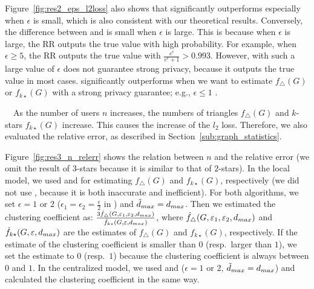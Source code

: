 Figure~\ref{fig:res2_eps_l2loss} also shows that 
 significantly outperforms  especially when $\epsilon$ is small, which is also consistent with our theoretical results. 
Conversely, the difference between  and  is small when $\epsilon$ is large. 
This is because when $\epsilon$ is large, the RR outputs the true value with high probability. 
For example, when 
$\epsilon \geq 5$, 
the RR outputs the true value with 
$\frac{e^\epsilon}{e^\epsilon+1} > 0.993$. 
However,  with 
such a large value of $\epsilon$ 
does not guarantee strong privacy, because it outputs the true value in most cases. 
 significantly outperforms  
when we want to estimate $f_\triangle(G)$ or $f_{k\star}(G)$ 
with a strong privacy guarantee; e.g., $\epsilon \leq 1$ \cite{DP_Li}. 

\smallskip
{}~~As the number of users $n$ increases, the numbers of triangles $f_\triangle(G)$ and $k$-stars $f_{k\star}(G)$ increase. 
This causes the increase of the $l_2$ loss. 
Therefore, we also evaluated the relative error, as described in Section~\ref{sub:graph_statistics}. 

Figure~\ref{fig:res3_n_relerr} shows the relation between $n$ and the relative error 
(we omit the result of $3$-stars because it is similar to that of $2$-stars). 
In the local model, we used  and  for estimating 
$f_\triangle(G)$ 
and 
$f_{k\star}(G)$, 
respectively 
(we did not use , because it is both inaccurate and inefficient). 
For both algorithms, we set $\epsilon = 1$ or $2$ 
($\epsilon_1 = \epsilon_2 = \frac{\epsilon}{2}$ in ) and $\tilde{d}_{max} = d_{max}$. 
Then we estimated the clustering coefficient as: $\frac{3\hat{f}_{\triangle}(G, \varepsilon_1, \varepsilon_2, d_{max})}{\hat{f}_{k\star}(G, \varepsilon, d_{max})}$, where 
$\hat{f}_{\triangle}(G, \varepsilon_1, \varepsilon_2, d_{max})$ and 
$\hat{f}_{k\star}(G, \varepsilon, d_{max})$ are the estimates of $f_\triangle(G)$ and $f_{k\star}(G)$, respectively. 
If the estimate of the clustering coefficient is smaller than $0$ (resp.~larger than $1$), we set the estimate to $0$ (resp.~$1$) because the clustering coefficient is always between $0$ and $1$. 
In the centralized model, we used  and  ($\epsilon=1$ or $2$, $\tilde{d}_{max} = d_{max}$) and calculated the clustering coefficient in the same way. 

